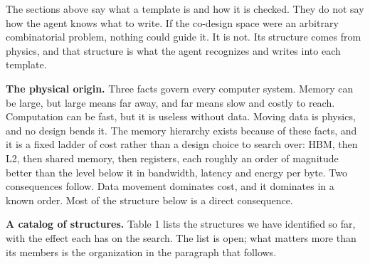 \documentclass[11pt]{article}
\begin{document}
The sections above say what a template is and how it is checked. They do not say how the agent knows what to write. If the co-design space were an arbitrary combinatorial problem, nothing could guide it. It is not. Its structure comes from physics, and that structure is what the agent recognizes and writes into each template.

\textbf{The physical origin.} Three facts govern every computer system. Memory can be large, but large means far away, and far means slow and costly to reach. Computation can be fast, but it is useless without data. Moving data is physics, and no design bends it. The memory hierarchy exists because of these facts, and it is a fixed ladder of cost rather than a design choice to search over: HBM, then L2, then shared memory, then registers, each roughly an order of magnitude better than the level below it in bandwidth, latency and energy per byte. Two consequences follow. Data movement dominates cost, and it dominates in a known order. Most of the structure below is a direct consequence.

\textbf{A catalog of structures.} Table 1 lists the structures we have identified so far, with the effect each has on the search. The list is open; what matters more than its members is the organization in the paragraph that follows.
\end{document}

